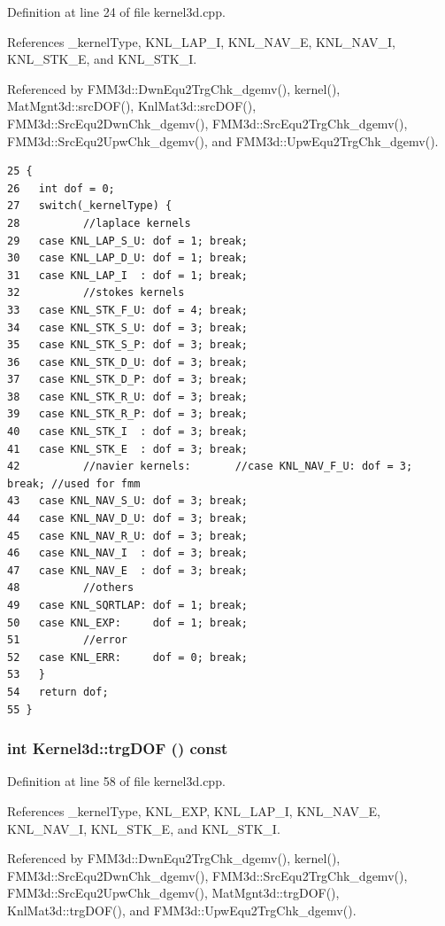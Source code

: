 Definition at line 24 of file kernel3d.cpp.

References \_\-kernel\-Type, KNL\_\-LAP\_\-I, KNL\_\-NAV\_\-E, KNL\_\-NAV\_\-I, KNL\_\-STK\_\-E, and KNL\_\-STK\_\-I.

Referenced by FMM3d::Dwn\-Equ2Trg\-Chk\_\-dgemv(), kernel(), Mat\-Mgnt3d::src\-DOF(), Knl\-Mat3d::src\-DOF(), FMM3d::Src\-Equ2Dwn\-Chk\_\-dgemv(), FMM3d::Src\-Equ2Trg\-Chk\_\-dgemv(), FMM3d::Src\-Equ2Upw\-Chk\_\-dgemv(), and FMM3d::Upw\-Equ2Trg\-Chk\_\-dgemv().

\footnotesize\begin{verbatim}25 {
26   int dof = 0;
27   switch(_kernelType) {
28          //laplace kernels
29   case KNL_LAP_S_U: dof = 1; break;
30   case KNL_LAP_D_U: dof = 1; break;
31   case KNL_LAP_I  : dof = 1; break;
32          //stokes kernels
33   case KNL_STK_F_U: dof = 4; break;
34   case KNL_STK_S_U: dof = 3; break;
35   case KNL_STK_S_P: dof = 3; break;
36   case KNL_STK_D_U: dof = 3; break;
37   case KNL_STK_D_P: dof = 3; break;
38   case KNL_STK_R_U: dof = 3; break;
39   case KNL_STK_R_P: dof = 3; break;
40   case KNL_STK_I  : dof = 3; break;
41   case KNL_STK_E  : dof = 3; break;
42          //navier kernels:       //case KNL_NAV_F_U: dof = 3; break; //used for fmm
43   case KNL_NAV_S_U: dof = 3; break;
44   case KNL_NAV_D_U: dof = 3; break;
45   case KNL_NAV_R_U: dof = 3; break;
46   case KNL_NAV_I  : dof = 3; break;
47   case KNL_NAV_E  : dof = 3; break;
48          //others
49   case KNL_SQRTLAP: dof = 1; break;
50   case KNL_EXP:     dof = 1; break;
51          //error
52   case KNL_ERR:     dof = 0; break;
53   }
54   return dof;
55 }
\end{verbatim}\normalsize 


\subsubsection{\setlength{\rightskip}{0pt plus 5cm}int Kernel3d::trg\-DOF () const}\label{classKernel3d_0d7423b81a78e2a050a8658d3d46cb9c_0d7423b81a78e2a050a8658d3d46cb9c}




Definition at line 58 of file kernel3d.cpp.

References \_\-kernel\-Type, KNL\_\-EXP, KNL\_\-LAP\_\-I, KNL\_\-NAV\_\-E, KNL\_\-NAV\_\-I, KNL\_\-STK\_\-E, and KNL\_\-STK\_\-I.

Referenced by FMM3d::Dwn\-Equ2Trg\-Chk\_\-dgemv(), kernel(), FMM3d::Src\-Equ2Dwn\-Chk\_\-dgemv(), FMM3d::Src\-Equ2Trg\-Chk\_\-dgemv(), FMM3d::Src\-Equ2Upw\-Chk\_\-dgemv(), Mat\-Mgnt3d::trg\-DOF(), Knl\-Mat3d::trg\-DOF(), and FMM3d::Upw\-Equ2Trg\-Chk\_\-dgemv().

